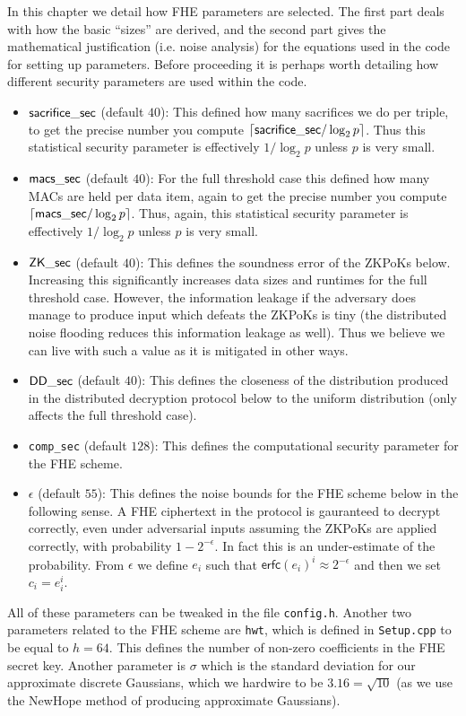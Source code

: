 \label{sec:fhe}
In this chapter we detail how FHE parameters are selected.
The first part deals with how the basic ``sizes'' are derived,
and the second part gives the mathematical justification (i.e.
noise analysis) for the equations used in the code for setting
up parameters.
Before proceeding it is perhaps worth detailing how
different security parameters are used within the code.

\begin{itemize}
\item $\mathsf{sacrifice\_sec}$ (default $40$): 
This defined how many sacrifices we do per triple, 
to get the precise number you compute ${\lceil \mathsf{sacrifice\_sec}/\log_2 p \rceil}$.
Thus this statistical security parameter is effectively
$1/\log_2 p$ unless $p$ is very small.
\item $\mathsf{macs\_sec}$ (default $40$):
For the full threshold case this defined how many MACs are held
per data item, again to get the precise number you compute 
${\lceil \mathsf{macs\_sec}/\log_2 p \rceil}$.
Thus, again, this statistical security parameter is effectively
$1/\log_2 p$ unless $p$ is very small.
\item $\mathsf{ZK\_sec}$ (default $40$):
This defines the soundness error of the ZKPoKs below.
Increasing this significantly increases data sizes and runtimes
for the full threshold case.
However, the information leakage if the adversary does manage
to produce input which defeats the ZKPoKs is tiny (the distributed
noise flooding reduces this information leakage as well). Thus
we believe we can live with such a value as it is mitigated
in other ways.
\item $\mathsf{DD\_sec}$ (default $40$):
This defines the closeness of the distribution produced
in the distributed decryption protocol below to the uniform
distribution (only affects the full threshold case).
\item \verb+comp_sec+ (default $128$):
This defines the computational security parameter for the
FHE scheme. 
\item $\epsilon$ (default $55$):
This defines the noise bounds for the FHE scheme below in
the following sense.
A FHE ciphertext in the protocol is gauranteed to decrypt
correctly, even under adversarial inputs assuming the
ZKPoKs are applied correctly, with probability $1-2^{-\epsilon}$.
In fact this is an under-estimate of the probability.
From $\epsilon$ we define $e_i$ such that 
$\mathsf{erfc}(e_i)^i \approx 2^{-\epsilon}$ and then we set $c_i = e_i^i$.
\end{itemize}
All of these parameters can be tweaked in the file
\verb+config.h+.
Another two parameters related to the FHE scheme are
\verb+hwt+, which is defined in \verb+Setup.cpp+ to
be equal to $h=64$.
This defines the number of non-zero coefficients in the
FHE secret key.
Another parameter is $\sigma$ which is the standard deviation
for our approximate discrete Gaussians, which we
hardwire to be $3.16 = \sqrt{10}$ (as we use the NewHope method
of producing approximate Gaussians).

